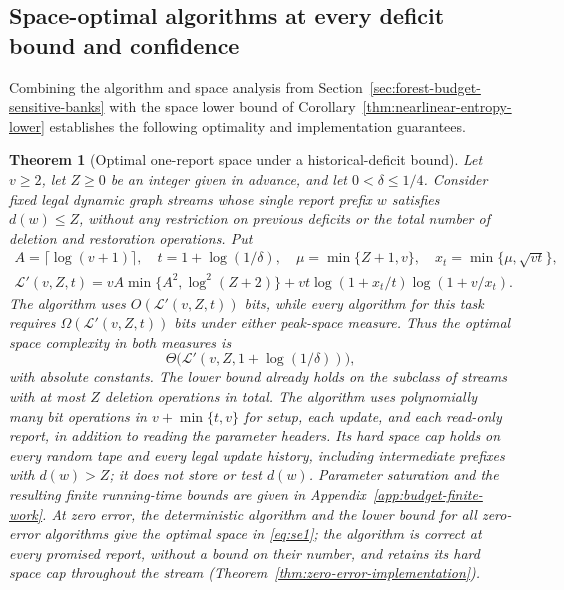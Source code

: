 \documentclass[11pt,letterpaper]{article}
\newtheorem{theorem}{Theorem}[section]
\numberwithin{equation}{section}
\begin{document}
\subsection{Space-optimal algorithms at every deficit bound and confidence}
\label{sec:budget-upper-bound}

Combining the algorithm and space analysis from Section~\ref{sec:forest-budget-sensitive-banks} with the space lower bound of Corollary~\ref{thm:nearlinear-entropy-lower} establishes the following optimality and implementation guarantees.

\begin{theorem}[Optimal one-report space under a historical-deficit bound]
\label{thm:budget-space-implementation}
\label{thm:historical-deficit-space}
Let $v\ge2$, let $Z\ge0$ be an integer given in advance, and let $0<\delta\le1/4$.
Consider fixed legal dynamic graph streams whose single report prefix $w$ satisfies $d(w)\le Z$, without any restriction on previous deficits or the total number of deletion and restoration operations.
Put
\begin{equation}
\begin{gathered}
 A=\lceil\log(v+1)\rceil,\quad t=1+\log(1/\delta),
 \quad \mu=\min\{Z+1,v\},\quad x_t=\min\{\mu,\sqrt{vt}\},\\
 \mathcal L'(v,Z,t)=
 vA\min\{A^2,\log^2(Z+2)\}
 +vt\log(1+x_t/t)\log(1+v/x_t).
 \end{gathered}                                      \label{eq:forest-pu4}
\end{equation}
The algorithm uses $O(\mathcal L'(v,Z,t))$ bits, while every algorithm for this task requires $\Omega(\mathcal L'(v,Z,t))$ bits under either peak-space measure.
Thus the optimal space complexity in both measures is
\begin{equation}
\Theta\bigl(\mathcal L'(v,Z,1+\log(1/\delta))\bigr),
\label{eq:sd3}
\end{equation}
with absolute constants.
The lower bound already holds on the subclass of streams with at most $Z$ deletion operations in total.
The algorithm uses polynomially many bit operations in $v+\min\{t,v\}$ for setup, each update, and each read-only report, in addition to reading the parameter headers.
Its hard space cap holds on every random tape and every legal update history, including intermediate prefixes with $d(w)>Z$; it does not store or test $d(w)$.
Parameter saturation and the resulting finite running-time bounds are given in Appendix~\ref{app:budget-finite-work}.
At zero error, the deterministic algorithm and the lower bound for all zero-error algorithms give the optimal space in \eqref{eq:se1}; the algorithm is correct at every promised report, without a bound on their number, and retains its hard space cap throughout the stream (Theorem~\ref{thm:zero-error-implementation}).
\end{theorem}
\end{document}
